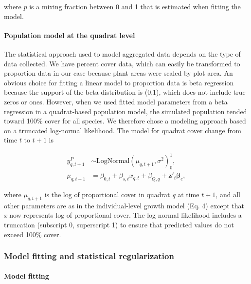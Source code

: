 \documentclass[12pt,]{article}
\begin{document}
where \(p\) is a mixing fraction between 0 and 1 that is estimated when
fitting the model.

\paragraph{Population model at the quadrat
level}\label{population-model-at-the-quadrat-level}

The statistical approach used to model aggregated data depends on the
type of data collected. We have percent cover data, which can easily be
transformed to proportion data in our case because plant areas were
scaled by plot area. An obvious choice for fitting a linear model to
proportion data is beta regression because the support of the beta
distribution is (0,1), which does not include true zeros or ones.
However, when we used fitted model parameters from a beta regression in
a quadrat-based population model, the simulated population tended toward
100\% cover for all species. We therefore chose a modeling approach
based on a truncated log-normal likelihood. The model for quadrat cover
change from time \(t\) to \(t+1\) is

\vspace{-3em}\begin{align}
y_{q,t+1}^{P} &\sim \text{LogNormal}(\mu_{q,t+1}, \sigma^2)_{0}^{1}, \\
\mu_{q,t+1} &= \beta_{0,t} + \beta_{s,t}x_{q,t} + \beta_{Q,q} + \textbf{z}'_t \boldsymbol{\beta}_c,
\end{align}\vspace{-3em}

where \(\mu_{q,t+1}\) is the log of proportional cover in quadrat
\emph{q} at time \(t+1\), and all other parameters are as in the
individual-level growth model (Eq. 4) except that \emph{x} now
represents log of proportional cover. The log normal likelihood includes
a truncation (subscript 0, superscript 1) to ensure that predicted
values do not exceed 100\% cover.

\subsubsection{Model fitting and statistical
regularization}\label{model-fitting-and-statistical-regularization}

\paragraph{Model fitting}\label{model-fitting}
\end{document}

